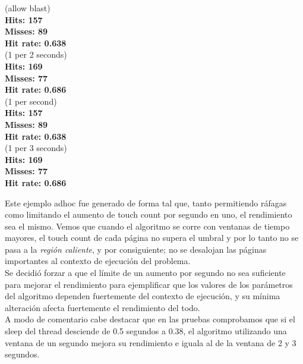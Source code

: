 \documentclass[11pt, a4paper, spanish]{article}
\begin{document}
\begin{multicols}{2}
 (allow blast)\\
\textbf{Hits: 157}\\
\textbf{Misses: 89}\\
\textbf{Hit rate: 0.638}\\

 (1 per 2 seconds)\\
\textbf{Hits: 169}\\
\textbf{Misses: 77}\\
\textbf{Hit rate: 0.686}\\

 (1 per second)\\
\textbf{Hits: 157}\\
\textbf{Misses: 89}\\
\textbf{Hit rate: 0.638}\\

 (1 per 3 seconds)\\
\textbf{Hits: 169}\\
\textbf{Misses: 77}\\
\textbf{Hit rate: 0.686}\\
\end{multicols}

Este ejemplo adhoc fue generado de forma tal que, tanto permitiendo r\'afagas como limitando el aumento de touch count por segundo en uno, el rendimiento sea el mismo. Vemos que cuando el algoritmo se corre con ventanas de tiempo mayores, el touch count de cada p\'agina no supera el umbral y por lo tanto no se pasa a la \textit{regi\'on caliente}, y por consiguiente; no se desalojan las p\'aginas importantes al contexto de ejecuci\'on del problema.\\

Se decidi\'o forzar a que el l\'imite de un aumento por segundo no sea suficiente para mejorar el rendimiento para ejemplificar que los valores de los par\'ametros del algoritmo dependen fuertemente del contexto de ejecuci\'on, y su m\'inima alteraci\'on afecta fuertemente el rendimiento del todo. \\

A modo de comentario cabe destacar que en las pruebas comprobamos que si el sleep del thread desciende de 0.5 segundos a 0.38, el algoritmo utilizando una ventana de un segundo mejora su rendimiento e iguala al de la ventana de 2 y 3 segundos.
\end{document}
